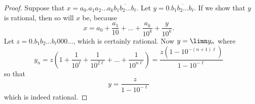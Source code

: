 \documentclass[11pt,dvipsnames]{book}
\numberwithin{figure}{section} %
\numberwithin{table}{section} %
\begin{document}
\begin{proof}
Suppose that $x=a_{0}.a_{1}a_{2}\ldots a_{k} \overline{b_{1}b_{2}\ldots b_{\ell}}$. Let $
 y= 0.\overline{b_{1}b_{2}\ldots b_{\ell}}$.
 If we show that $y$ is rational, then so will $x$ be, because
 \[x = a_0 + \frac{a_1}{10} + \dots + \frac{a_k}{10^k} + \frac{y}{10^{k}}.
 \]
 Let $z = 0.{b_{1}b_{2}\ldots b_{\ell}}000\ldots$, which is certainly rational. Now
 $y = \limn y_n$ where
 \[ y_n = z\left(1 + \frac{1}{10^{\ell}} + \frac{1}{10^{2\ell}} + \dots + \frac{1}{10^{n\ell}}\right) = \frac{z\left(1 - 10^{-(n+1)\ell}\right)}{1- 10^{-\ell}} \]
 so that
 \[y = \frac{z}{1- 10^{-\ell}}\]
which is indeed rational.

%


\end{proof}
\end{document}
